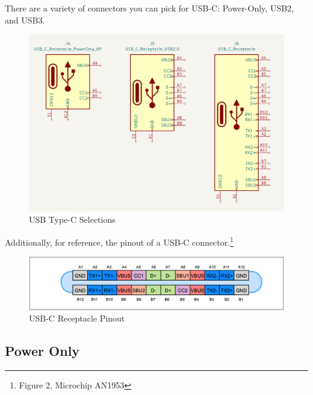 \documentclass[12pt]{article}
\begin{document}
There are a variety of connectors you can pick for USB-C: Power-Only, USB2, and USB3. 

\begin{figure}[h]
	\centering
	\includegraphics[width=1\linewidth]{images/3-USB-C.png}
	\caption{USB Type-C Selections}
	\label{fig:usbc-3-ports}
\end{figure}

Additionally, for reference, the pinout of a USB-C connector.\footnote{Figure 2, Microchip AN1953}


\begin{figure}[h]
	\centering
	\includegraphics[width=1\linewidth]{images/microchip-pinout.png}
	\caption{USB-C Receptacle Pinout}
	\label{fig:usb-c-pinout-microchip}
\end{figure}

\newpage

\subsection{Power Only}
\end{document}
